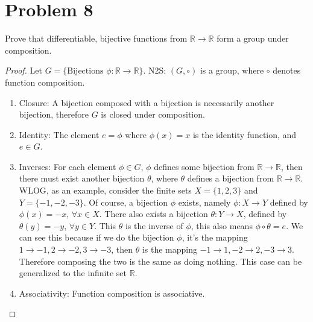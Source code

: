\documentclass[hidelinks,12pt]{article}
\newcommand{\R}{\mathbb{R}}
\begin{document}
\section{Problem 8}
Prove that differentiable, bijective functions from $\R\to\R$ form a group under composition.\begin{proof}
Let $G=\{\text{Bijections } \phi:\R\to\R\}$. N2S: $(G,\circ)$ is a group, where $\circ$ denotes function composition.\begin{enumerate}
    \item Closure: A bijection composed with a bijection is necessarily another bijection, therefore $G$ is closed under composition.
    \item Identity: The element $e=\phi$ where $\phi(x)=x$ is the identity function, and $e\in G$.
    \item Inverses: For each element $\phi\in G$, $\phi$ defines some bijection from $\R\to\R$, then there must exist another bijection $\theta$, where $\theta$ defines a bijection from $\R\to\R$. WLOG, as an example, consider the finite sets $X=\{1,2,3\}$ and $Y=\{-1,-2,-3\}$. Of course, a bijection $\phi$ exists, namely $\phi:X\to Y$ defined by $\phi(x)=-x$, $\forall x\in X$. There also exists a bijection $\theta:Y\to X$, defined by $\theta(y)=-y$, $\forall y\in Y$. This $\theta$ is the inverse of $\phi$, this also means $\phi \circ \theta=e$. We can see this because if we do the bijection $\phi$, it's the mapping $1\to -1,2\to -2, 3\to -3$, then $\theta$ is the mapping $-1\to 1,-2\to 2, -3\to 3$. Therefore composing the two is the same as doing nothing. This case can be generalized to the infinite set $\R$.
    \item Associativity: Function composition is associative.
\end{enumerate}
\end{proof}
\end{document}
